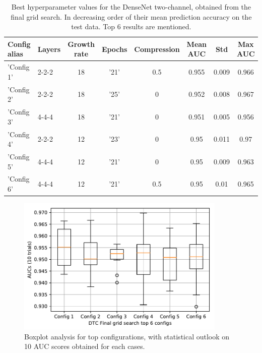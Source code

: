 \begin{table}[ht]
\centering
\caption[Best hyperparameter values for the DenseNet two-channel ...]{Best hyperparameter values for the DenseNet two-channel, obtained from the final grid search. In decreasing order of their mean prediction accuracy on the test data. 
Top 6 results are mentioned.}
\resizebox{\textwidth}{!}
{\begin{tabular}{|l l c c c c c c|} 
 \hline\hline
 \rowcolor{lightgrey}
\textbf{Config alias} & \textbf{Layers} & \textbf{Growth rate} & \textbf{Epochs} & \textbf{Compression} & \textbf{Mean AUC} & \textbf{Std} & \textbf{Max AUC}\\
\hline
'Config 1' & 2-2-2 & 18 & '21' & 0.5 & 0.955 & 0.009 & 0.966 \\
'Config 2' & 2-2-2 & 18 & '25' & 0 & 0.952 & 0.008 & 0.967 \\
'Config 3' & 4-4-4 & 18 & '21' & 0 & 0.951 & 0.005 & 0.956  \\
'Config 4' & 2-2-2 & 12 & '23' & 0 & 0.95 & 0.011 & 0.97 \\
'Config 5' & 4-4-4 & 12 & '21' & 0 & 0.95 & 0.009 & 0.963  \\
'Config 6' & 4-4-4 & 12 & '21' & 0.5 & 0.95 & 0.01 & 0.965  \\
\hline \hline
\end{tabular}}
\label{table:dtc_final_run_best_configs}
\end{table}

\begin{figure}[ht]
\centering
\includegraphics[width=10cm]{images/densenet/simple/top_config_boxplot}
\caption{Boxplot analysis for top configurations, with statistical outlook on 10 AUC scores obtained for each cases.}
\label{fig:top_config_boxplot_dtc}
\end{figure}

